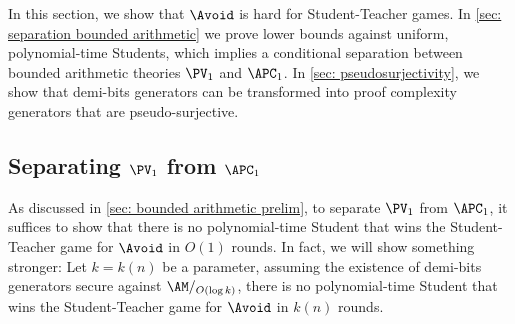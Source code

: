 In this section, we show that $\Avoid$ is hard for Student-Teacher games. In \autoref{sec: separation bounded arithmetic} we prove lower bounds against uniform, polynomial-time Students, which implies a conditional separation between bounded arithmetic theories $\PV_1$ and $\APC_1$. In \autoref{sec: pseudosurjectivity}, we show that demi-bits generators can be transformed into proof complexity generators that are pseudo-surjective.

\subsection{Separating \texorpdfstring{$\PV_1$}{PV1} from \texorpdfstring{$\APC_1$}{APC1}}\label{sec: separation bounded arithmetic}

As discussed in \autoref{sec: bounded arithmetic prelim}, to separate $\PV_1$ from $\APC_1$, it suffices to show that there is no polynomial-time Student that wins the Student-Teacher game for $\Avoid$ in $O(1)$ rounds. In fact, we will show something stronger: Let $k = k(n)$ be a parameter, assuming the existence of demi-bits generators secure against $\AM/_{O(\log k)}$, there is no polynomial-time Student that wins the Student-Teacher game for $\Avoid$ in $k(n)$ rounds.

